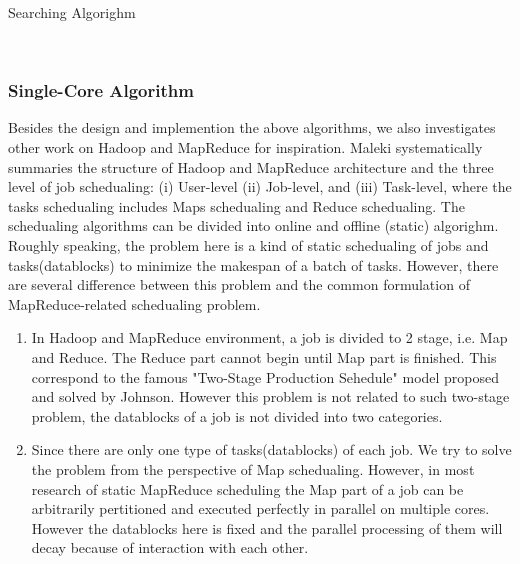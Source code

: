 \documentclass{llncs}
\begin{document}
   \begin{minipage}[t]{0.9\textwidth}
     \begin{algorithm}[H]
       \BlankLine
       \caption{Searching Algorighm}\label{Alg_2}
       \BlankLine
     \end{algorithm}
   \end{minipage}\\

\subsubsection{Single-Core Algorithm}{}
  Besides the design and implemention the above algorithms, we also investigates other work on Hadoop and MapReduce\cite{maleki2019mapreduce} for inspiration. Maleki\cite{maleki2020tmar} systematically summaries the structure of Hadoop and MapReduce architecture and the three level of job schedualing: (i) User-level (ii) Job-level, and (iii) Task-level, where the tasks schedualing includes Maps schedualing and Reduce schedualing. The schedualing algorithms can be divided into online and offline (static) algorighm. Roughly speaking, the problem here is a kind of static schedualing of jobs and tasks(datablocks) to minimize the makespan of a batch of tasks. However, there are several difference between this problem and the common formulation of MapReduce-related schedualing problem.
  \begin{enumerate}
    \item In Hadoop and MapReduce environment, a job is divided to 2 stage, i.e. Map and Reduce. The Reduce part cannot begin until Map part is finished. This correspond to the famous "Two-Stage Production Sehedule" model proposed and solved by Johnson\cite{johnson1954optimal}. However this problem is not related to such two-stage problem, the datablocks of a job is not divided into two categories.
    \item Since there are only one type of tasks(datablocks) of each job. We try to solve the problem from the perspective of Map schedualing. However, in most research of static MapReduce scheduling\cite{verma2013orchestrating,maleki2020tmar,zhu2014minimizing} the Map part of a job can be arbitrarily pertitioned and executed perfectly in parallel on multiple cores. However the datablocks here is fixed and the parallel processing of them will decay because of interaction with each other.
  \end{enumerate}
\end{document}
